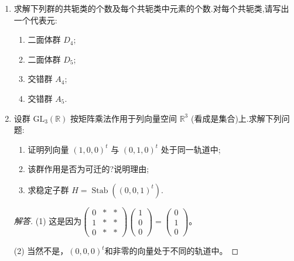 \begin{enumerate}
\item 求解下列群的共轭类的个数及每个共轭类中元素的个数.对每个共轭类,请写出一个代表元:
\begin{enumerate}[label=(\arabic*)]
\item 二面体群 $D_4$;
\item 二面体群 $D_5$;
\item 交错群 $A_4$;
\item 交错群 $A_5$.
\end{enumerate}
\item 设群 $\mathrm{GL}_{3}(\mathbb{R})$ 按矩阵乘法作用于列向量空间 $\mathbb{R}^3$ (看成是集合)上.求解下列问题:
\begin{enumerate}[label=(\arabic*)]
\item 证明列向量 $(1,0,0)^t$ 与 $(0,1,0)^t$ 处于同一轨道中;
\item 该群作用是否为可迁的?说明理由;
\item 求稳定子群 $H = \operatorname{Stab}((0,0,1)^t)$.
\end{enumerate}
\begin{proof}[解答]
    (1) 这是因为$\begin{pmatrix}0&*&*\\1&*&*\\0&*&*\end{pmatrix}
    \begin{pmatrix}1\\0\\0\end{pmatrix}=\begin{pmatrix}0\\1\\0\end{pmatrix}$。

    (2) 当然不是，$(0,0,0)^t$和非零的向量处于不同的轨道中。


\end{proof}
\end{enumerate}
